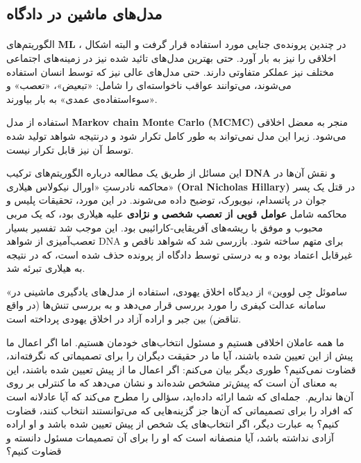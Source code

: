 \documentclass[12pt,oneside]{book}
\begin{document}
    \subsection{مدل‌های ماشین در دادگاه}
    \paragraph{}
    الگوریتم‌های \textenglish{\textbf{ML}} ، در چندین پرونده‌ی جنایی مورد استفاده قرار گرفت و البته اشکال اخلاقی را نیز به بار آورد.
    حتی بهترین مدل‌های تائید شده نیز در زمینه‌های اجتماعی مختلف نیز عملکر متفاوتی دارند.
    حتی مدل‌های عالی نیز که توسط انسان استفاده می‌شوند، می‌توانند عواقب ناخواسته‌ای را شامل: «تبعیض»، «تعصب» و «سوءاستفاده‌ی عمدی» به بار بیاورند.

    استفاده از مدل \textenglish{\textbf{Markov chain Monte Carlo (MCMC)}} منجر به معضل اخلاقی می‌شود.
    زیرا این مدل نمی‌تواند به طور کامل تکرار شود و درنتیجه شواهد تولید شده توسط آن نیز قابل تکرار نیست.

    این مسائل از طریق یک مطالعه درباره الگوریتم‌های ترکیب \textenglish{\textbf{DNA}}  و نقش آن‌ها در محاکمه نادرستِ «اورال نیکولاس هیلاری» \textenglish{\textbf{(Oral Nicholas Hillary)}}  در قتل یک پسر جوان در پاتسدام، نیویورک، توضیح داده می‌شوند.
    در این مورد، تحقیقات پلیس و محاکمه شامل \textbf{عوامل قویی از تعصب شخصی و نژادی} علیه هیلاری بود، که یک مربی محبوب و موفق با ریشه‌های آفریقایی-کارائیبی بود.
    این موجب شد تفسیر بسیار تعصب‌آمیزی از شواهد DNA برای متهم ساخته شود.
    بازرسی شد که شواهد ناقص و غیرقابل اعتماد بوده و به درستی توسط دادگاه از پرونده حذف شده است، که در نتیجه به هیلاری تبرئه شد.

    «ساموئل جِی لووین» از دیدگاه اخلاق یهودی، استفاده از مدل‌های یادگیری ماشینی در سامانه عدالت کیفری را مورد بررسی قرار می‌دهد و به بررسی تنش‌ها (در واقع تناقض) بین جبر و اراده آزاد در اخلاق یهودی پرداخته است.

    ما همه عاملان اخلاقی هستیم و مسئول انتخاب‌های خودمان هستیم.
    اما اگر اعمال ما پیش از این تعیین شده باشند، آیا ما در حقیقت دیگران را برای تصمیماتی که نگرفته‌اند، قضاوت نمی‌کنیم؟ طوری دیگر بیان می‌کنم: اگر اعمال ما از پیش تعیین شده باشند، این به معنای آن است که پیش‌تر مشخص شده‌اند و نشان می‌دهد که ما کنترلی بر روی آن‌ها نداریم.\     جمله‌ای که شما ارائه داده‌اید، سؤالی را مطرح می‌کند که آیا عادلانه است که افراد را برای تصمیماتی که آن‌ها جز گزینه‌هایی که می‌توانستند انتخاب کنند، قضاوت کنیم؟ به عبارت دیگر، اگر انتخاب‌های یک شخص از پیش تعیین شده باشد و او اراده آزادی نداشته باشد، آیا منصفانه است که او را برای آن تصمیمات مسئول دانسته و قضاوت کنیم؟
\end{document}
